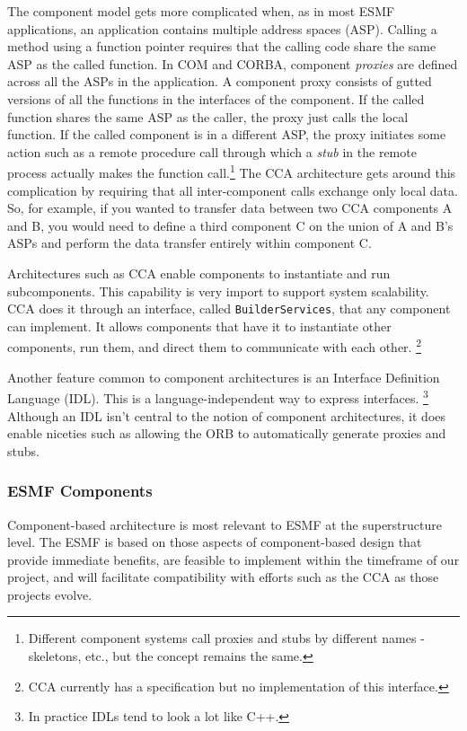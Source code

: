 The component model gets more complicated when, as in most ESMF applications, 
an application contains multiple address spaces (ASP).  Calling a 
method using a function pointer requires that the calling code share the 
same ASP as the called function.  
In COM and CORBA, component {\it proxies} are defined across
all the ASPs in the application.  A component proxy consists of gutted 
versions of all the functions in the interfaces of the component.  If the 
called function shares the same ASP as the caller, the proxy just 
calls the local function.  If the called component is in a different ASP, 
the proxy initiates some action such as a remote procedure call through which 
a {\it stub} in the remote process actually makes the function call.\footnote{Different 
component systems call proxies and 
stubs by different names - skeletons, etc., but the concept remains the same.}  
The CCA architecture gets around this complication by 
requiring that all inter-component calls exchange only local data.  So, for example,
if you wanted to transfer data between two CCA components A and B, you would need 
to define a third component C on the union of A and B's ASPs and perform
the data transfer entirely within component C.

Architectures such as CCA enable components to instantiate and run 
subcomponents.  This
capability is very import to support system scalability.  CCA does it 
through an interface, called {\tt BuilderServices}, that any component
can implement.  It allows components that have it to instantiate other
components, run them, and direct them to communicate with each other.
\footnote{CCA currently has a specification but no implementation of this interface.}

Another feature common to component architectures is an Interface Definition 
Language (IDL).  This is a language-independent way to express 
interfaces.  \footnote{In practice IDLs tend to look a lot like C++.}  
Although 
an IDL isn't central to the notion of component architectures, it does enable 
niceties such as allowing the ORB to automatically generate proxies and stubs.

\subsubsection{ESMF Components}

Component-based architecture is most relevant to ESMF at the superstructure level. 
The ESMF is based on those aspects of component-based design that
provide immediate benefits, are feasible to implement within the
timeframe of our project, and will facilitate compatibility with efforts
such as the CCA as those projects evolve.  

